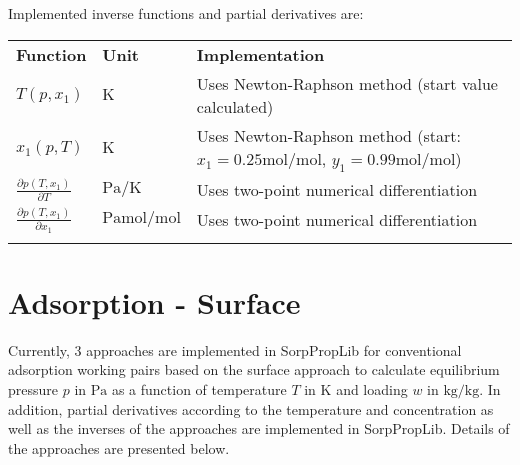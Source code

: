 %
Implemented inverse functions and partial derivatives are:
%
\begin{longtable}[l]{l|l|p{7.5cm}}
	\toprule
	\addlinespace
	\textbf{Function} & \textbf{Unit} &	\textbf{Implementation} \\
	\addlinespace
	\midrule
	\endhead
	
	\bottomrule
	\endfoot
	\bottomrule
	\endlastfoot
	\addlinespace
	
	$T(p,x_1)$	& $\si{\kelvin}$ & Uses Newton-Raphson method (start value calculated) \\
	$x_1(p,T)$	& $\si{\kelvin}$ & Uses Newton-Raphson method (start: $x_1 = 0.25 \si{\mole\per\mole}$, $y_1 = 0.99 \si{\mole\per\mole}$) \\
	$\frac{\partial p(T,x_1)}{\partial T}$	& $\si{\pascal\per\kelvin}$ & Uses two-point numerical differentiation\\
	$\frac{\partial p(T,x_1)}{\partial x_1}$	& $\si{\pascal\mole\per\mole}$ & Uses two-point numerical differentiation\\
	
	\addlinespace
\end{longtable}
%
\section{Adsorption - Surface}
\label{cha:ads:sur}
%
Currently, 3 approaches are implemented in SorpPropLib for conventional adsorption working pairs based on the surface approach to calculate equilibrium pressure $p$ in $\si{\pascal}$ as a function of temperature $T$ in $\si{\kelvin}$ and loading $w$ in $\si{\kilogram\per\kilogram}$. In addition, partial derivatives according to the temperature and concentration as well as the inverses of the approaches are implemented in SorpPropLib. Details of the approaches are presented below.
